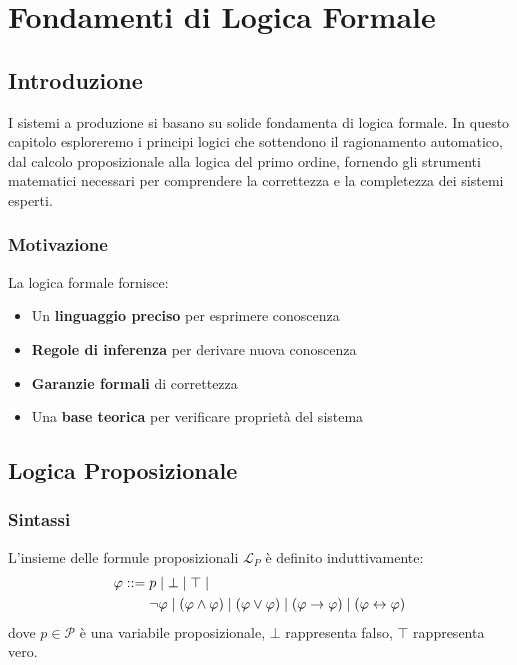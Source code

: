 
\chapter{Fondamenti di Logica Formale}
\label{cap:logica_formale}

\section{Introduzione}

I sistemi a produzione si basano su solide fondamenta di logica formale. In questo capitolo esploreremo i principi logici che sottendono il ragionamento automatico, dal calcolo proposizionale alla logica del primo ordine, fornendo gli strumenti matematici necessari per comprendere la correttezza e la completezza dei sistemi esperti.

\subsection{Motivazione}

La logica formale fornisce:
\begin{itemize}
\item Un \textbf{linguaggio preciso} per esprimere conoscenza
\item \textbf{Regole di inferenza} per derivare nuova conoscenza
\item \textbf{Garanzie formali} di correttezza
\item Una \textbf{base teorica} per verificare proprietà del sistema
\end{itemize}

\section{Logica Proposizionale}

\subsection{Sintassi}

\begin{definizione}
L'insieme delle formule proposizionali $\mathcal{L}_P$ è definito induttivamente:
\begin{align}
\varphi ::= &\; p \mid \bot \mid \top \mid \notag \\
            &\; \neg \varphi \mid (\varphi \land \varphi) \mid (\varphi \lor \varphi) \mid (\varphi \rightarrow \varphi) \mid (\varphi \leftrightarrow \varphi)
\end{align}
dove $p \in \mathcal{P}$ è una variabile proposizionale, $\bot$ rappresenta falso, $\top$ rappresenta vero.
\end{definizione}

